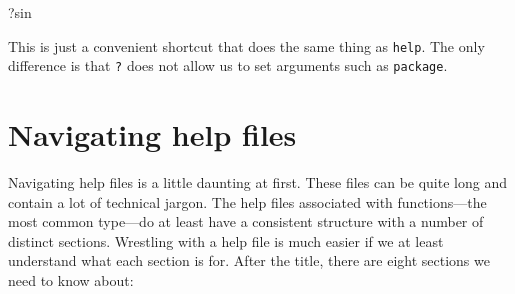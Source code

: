 \documentclass[
]{book}
\newenvironment{Shaded}{\begin{snugshade}}{\end{snugshade}}
\newcommand{\NormalTok}[1]{#1}
\begin{document}
\begin{Shaded}
\begin{Highlighting}[]
\NormalTok{?sin}
\end{Highlighting}
\end{Shaded}

This is just a convenient shortcut that does the same thing as \texttt{help}. The only difference is that \texttt{?} does not allow us to set arguments such as \texttt{package}.

\hypertarget{nav-help}{%
\section{Navigating help files}\label{nav-help}}

Navigating help files is a little daunting at first. These files can be quite long and contain a lot of technical jargon. The help files associated with functions---the most common type---do at least have a consistent structure with a number of distinct sections. Wrestling with a help file is much easier if we at least understand what each section is for. After the title, there are eight sections we need to know about:
\end{document}
